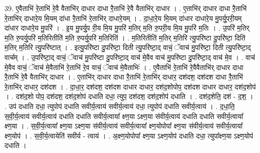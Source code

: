 \documentclass[17pt]{extarticle}
\begin{document}
39. ए॒वैताभि॑ रे॒ताभि॑ रे॒वै वैताभि॑र् दाधार दाधा रै॒ताभि॑ रे॒वै वैताभि॑र् दाधार । . ए॒ताभि॑र् दाधार दाधा रै॒ताभि॑ रे॒ताभि॑र् दाधारे॒य मि॒यम् दा॑धा रै॒ताभि॑ रे॒ताभि॑र् दाधारे॒यम् । . दा॒धा॒रे॒य मि॒यम् दा॑धार दाधारे॒य मु॒पर्यु॒परी॒यम् दा॑धार दाधारे॒य मु॒परि॑ । . इ॒य मु॒पर्यु॒प री॒य मि॒य मु॒परि॑ म॒तिर् म॒ति रु॒परी॒य मि॒य मु॒परि॑ म॒तिः । . उ॒परि॑ म॒तिर् म॒ति रु॒पर्यु॒परि॑ म॒तिरितीति॑ म॒ति रु॒पर्यु॒परि॑ म॒तिरिति॑ । . म॒तिरितीति॑ म॒तिर् म॒तिरि त्यु॒परि॑ष्टा दु॒परि॑ष्टा॒ दिति॑ म॒तिर् म॒तिरि त्यु॒परि॑ष्टात् । . इत्यु॒परि॑ष्टा दु॒परि॑ष्टा॒ दिती त्यु॒परि॑ष्टा॒द् वाचं॒ ॅवाच॑ मु॒परि॑ष्टा॒ दिती त्यु॒परि॑ष्टा॒द् वाच᳚म् । . उ॒परि॑ष्टा॒द् वाचं॒ ॅवाच॑ मु॒परि॑ष्टा दु॒परि॑ष्टा॒द् वाच॑ मे॒वैव वाच॑ मु॒परि॑ष्टा दु॒परि॑ष्टा॒द् वाच॑ मे॒व । . वाच॑ मे॒वैव वाचं॒ ॅवाच॑ मे॒वैताभि॑ रे॒ताभि॑ रे॒व वाचं॒ ॅवाच॑ मे॒वैताभिः॑ । . ए॒वैताभि॑ रे॒ताभि॑ रे॒वैवैताभि॑र् दाधार दाधा रै॒ताभि॑ रे॒वै वैताभि॑र् दाधार । . ए॒ताभि॑र् दाधार दाधा रै॒ताभि॑ रे॒ताभि॑र् दाधार॒ दश॑दश॒ दश॑दश दाधा रै॒ताभि॑ रे॒ताभि॑र् दाधार॒ दश॑दश । . दा॒धा॒र॒ दश॑दश॒ दश॑दश दाधार दाधार॒ दश॑द॒शोपोप॒ दश॑दश दाधार दाधार॒ दश॑द॒शोप॑ । . दश॑द॒शो पोप॒ दश॑दश॒ दश॑द॒शोप॑ दधाति दधा॒ त्युप॒ दश॑दश॒ दश॑द॒शोप॑ दधाति । . दश॑द॒शेति॒ दश॑ - द॒श॒ । . उप॑ दधाति दधा॒ त्युपोप॑ दधाति सवीर्य॒त्वाय॑ सवीर्य॒त्वाय॑ दधा॒ त्युपोप॑ दधाति सवीर्य॒त्वाय॑ । . द॒धा॒ति॒ स॒वी॒र्य॒त्वाय॑ सवीर्य॒त्वाय॑ दधाति दधाति सवीर्य॒त्वाया᳚ क्ष्ण॒या ऽक्ष्ण॒या स॑वीर्य॒त्वाय॑ दधाति दधाति सवीर्य॒त्वाया᳚ क्ष्ण॒या । . स॒वी॒र्य॒त्वाया᳚ क्ष्ण॒या ऽक्ष्ण॒या स॑वीर्य॒त्वाय॑ सवीर्य॒त्वाया᳚ क्ष्ण॒योपोपा᳚ क्ष्ण॒या स॑वीर्य॒त्वाय॑ सवीर्य॒त्वाया᳚ क्ष्ण॒योप॑ । . स॒वी॒र्य॒त्वायेति॑ सवीर्य - त्वाय॑ । . अ॒क्ष्ण॒योपोपा᳚ क्ष्ण॒या ऽक्ष्ण॒योप॑ दधाति दधा॒ त्युपा᳚क्ष्ण॒या ऽक्ष्ण॒योप॑ दधाति । \newline
\pagebreak
{}
\end{document}
